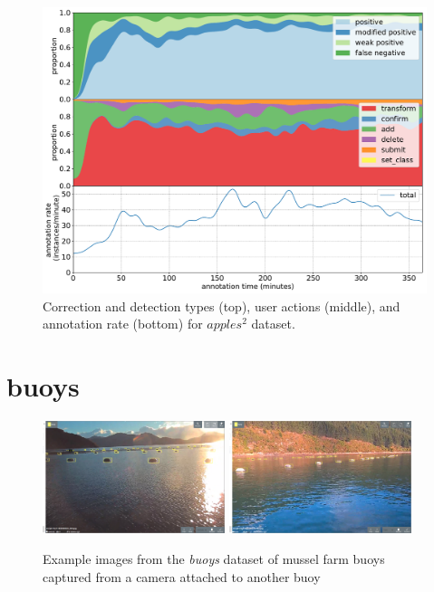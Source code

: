 \begin{figure}[!h]
\centering
\includegraphics[width=1.0\linewidth]{charts/action_annotations/apples2.pdf}
\caption{Correction and detection types (top), user actions (middle), and annotation rate (bottom) for $apples^2$ dataset.}
\label{fig:apples2_annotation}
\end{figure}

\pagebreak
\section{buoys}
\label{sec:buoys_details}


\begin{figure}[H]
  \includegraphics[width=0.475\textwidth]{figures/annotation/screenshots/buoys.png}
  \hfill
  \includegraphics[width=0.475\textwidth]{figures/annotation/screenshots/buoys2.png}
  \caption{Example images from the \emph{buoys} dataset of mussel farm buoys captured from a camera attached to another buoy }
  \label{fig:buoys_dataset}
\end{figure}

